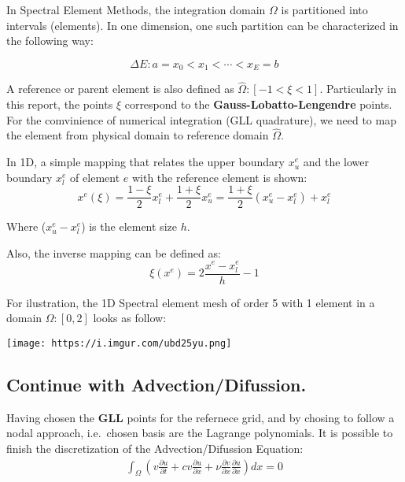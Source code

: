 \documentclass[
  a4paper,
  10pt]{article}
\begin{document}
In Spectral Element Methods, the integration domain \(\Omega\) is
partitioned into intervals (elements). In one dimension, one such
partition can be characterized in the following way:

\begin{equation}
    \Delta{E} : a=x_0<x_1< \cdots < x_E =b
\end{equation}

A reference or parent element is also defined as
\(\hat{\Omega}:[-1 < \xi < 1]\). Particularly in this report, the points
\(\xi\) correspond to the \textbf{Gauss-Lobatto-Lengendre} points. For
the comvinience of numerical integration (GLL quadrature), we need to
map the element from physical domain to reference domain
\(\hat{\Omega}\).

In 1D, a simple mapping that relates the upper boundary \(x^{e}_u\) and
the lower boundary \(x^{e}_l\) of element \(e\) with the reference
element is shown: \begin{equation}
    x^{e}(\xi) = \frac{1-\xi}{2}x^{e}_l+ \frac{1+\xi}{2}x^{e}_u = \frac{1+\xi}{2}(x^{e}_u-x^{e}_l)+x^{e}_l
\end{equation}

Where (\(x^{e}_u-x^{e}_l\)) is the element size \(h\).

Also, the inverse mapping can be defined as: \begin{equation}
    \xi(x^{e}) = 2\frac{x^{e}-x^{e}_l}{h}-1 
\end{equation}

For ilustration, the 1D Spectral element mesh of order 5 with 1 element
in a domain \(\Omega:[0,2]\) looks as follow:

\texttt{[image: https://i.imgur.com/ubd25yu.png]}

\hypertarget{continue-with-advectiondifussion.}{%
\subsection{Continue with
Advection/Difussion.}\label{continue-with-advectiondifussion.}}

Having chosen the \textbf{GLL} points for the refernece grid, and by
chosing to follow a nodal approach, i.e.~chosen basis are the Lagrange
polynomials. It is possible to finish the discretization of the
Advection/Difussion Equation: \begin{align}
\int_{\Omega} (v\frac{\partial u}{\partial t} + cv\frac{\partial u}{\partial x} + \nu\frac{\partial v}{\partial x}\frac{\partial u}{\partial x})dx = 0
\end{align}
\end{document}
